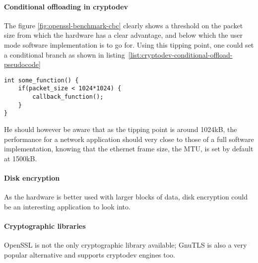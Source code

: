 \paragraph{Conditional offloading in cryptodev}
The figure \ref{fig:openssl-benchmark-cbc} clearly shows a threshold on the packet size from which the hardware has a clear advantage, and below which the user mode software implementation is to go for.
Using this tipping point, one could set a conditional branch as shown in listing~\ref{list:cryptodev-conditional-offload-pseudocode}

\lstset{language=c}
\begin{lstlisting}[caption=cryptodev conditional offloading, label=list:cryptodev-conditional-offload-pseudocode]
int some_function() {
	if(packet_size < 1024*1024) {
		callback_function();
	}
}
\end{lstlisting}

He should however be aware that as the tipping point is around 1024kB, the performance for a network application should very close to those of a full software implementation, knowing that the ethernet frame size, the MTU, is set by default at 1500kB.

\paragraph{Disk encryption}
As the hardware is better used with larger blocks of data, disk encryption could be an interesting application to look into.

\paragraph{Cryptographic libraries}
OpenSSL is not the only cryptographic library available; GnuTLS is also a very popular alternative and supports cryptodev engines too.

